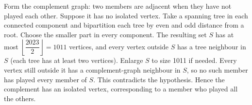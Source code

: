 Form the complement graph: two members are adjacent when they have not played each other. Suppose it has no isolated vertex. Take a spanning tree in each connected component and bipartition each tree by even and odd distance from a root. Choose the smaller part in every component. The resulting set $S$ has at most $\left\lfloor\dfrac{2023}{2}\right\rfloor=1011$ vertices, and every vertex outside $S$ has a tree neighbour in $S$ (each tree has at least two vertices). Enlarge $S$ to size 1011 if needed. Every vertex still outside it has a complement-graph neighbour in $S$, so no such member has played every member of $S$. This contradicts the hypothesis. Hence the complement has an isolated vertex, corresponding to a member who played all the others.
